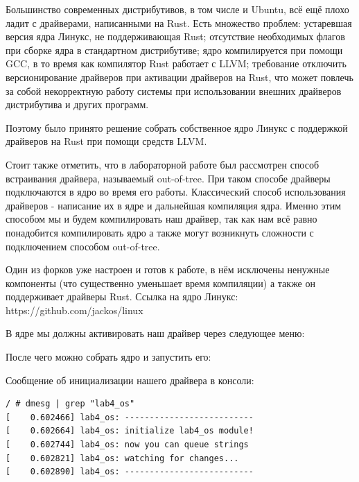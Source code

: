 \documentclass[a4paper,14pt]{extarticle}
\begin{document}
Большинство современных дистрибутивов, в том числе и Ubuntu, всё ещё плохо
ладит с драйверами, написанными на Rust. Есть множество проблем: устаревшая
версия ядра Линукс, не поддерживающая Rust; отсутствие необходимых флагов
при сборке ядра в стандартном дистрибутиве; ядро компилируется при помощи GCC,
в то время как компилятор Rust работает с LLVM; требование отключить версионирование
драйверов при активации драйверов на Rust, что может повлечь за собой некорректную
работу системы при использовании внешних драйверов дистрибутива и других программ.

Поэтому было принято решение собрать собственное ядро Линукс с поддержкой драйверов
на Rust при помощи средств LLVM. 

Стоит также отметить, что в лабораторной работе был рассмотрен способ встраивания 
драйвера, называемый out-of-tree. При таком способе драйверы подключаются в ядро 
во время его работы. Классический способ использования драйверов - написание их
в ядре и дальнейшая компиляция ядра. Именно этим способом мы и будем компилировать 
наш драйвер, так как нам всё равно понадобится компилировать ядро а также могут возникнуть
сложности с подключением способом out-of-tree. 

Один из форков уже настроен и готов к работе, в нём исключены ненужные компоненты (что
существенно уменьшает время компиляции) а также он поддерживает драйверы Rust. 
Ссылка на ядро Линукс: https://github.com/jackos/linux

В ядре мы должны активировать наш драйвер через следующее меню:

После чего можно собрать ядро и запустить его:


Сообщение об инициализации нашего драйвера в консоли:
\begin{verbatim}
/ # dmesg | grep "lab4_os"
[    0.602466] lab4_os: --------------------------
[    0.602664] lab4_os: initialize lab4_os module!
[    0.602744] lab4_os: now you can queue strings
[    0.602821] lab4_os: watching for changes...
[    0.602890] lab4_os: --------------------------
\end{verbatim}
\end{document}
